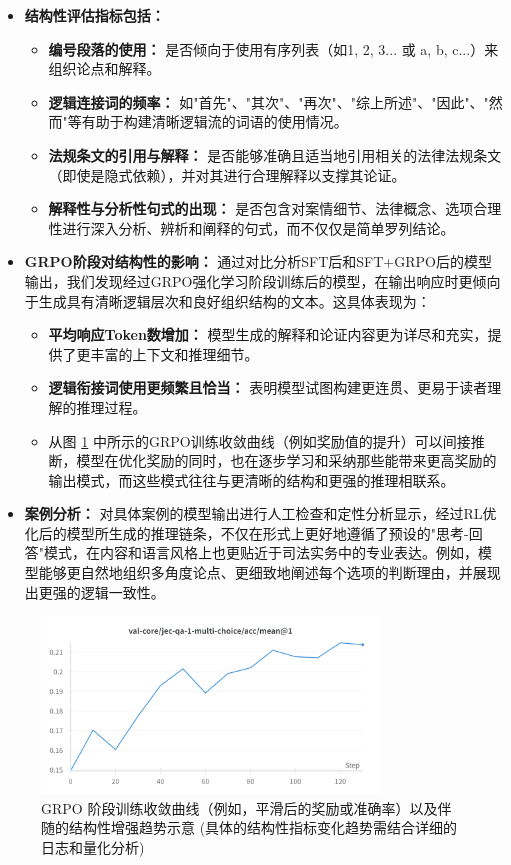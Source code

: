\documentclass{article}
\begin{document}
\begin{itemize}
    \item \textbf{结构性评估指标包括：}
    \begin{itemize}
        \item \textbf{编号段落的使用：} 是否倾向于使用有序列表（如1, 2, 3... 或 a, b, c...）来组织论点和解释。
        \item \textbf{逻辑连接词的频率：} 如"首先"、"其次"、"再次"、"综上所述"、"因此"、"然而"等有助于构建清晰逻辑流的词语的使用情况。
        \item \textbf{法规条文的引用与解释：} 是否能够准确且适当地引用相关的法律法规条文（即使是隐式依赖），并对其进行合理解释以支撑其论证。
        \item \textbf{解释性与分析性句式的出现：} 是否包含对案情细节、法律概念、选项合理性进行深入分析、辨析和阐释的句式，而不仅仅是简单罗列结论。
    \end{itemize}
    \item \textbf{GRPO阶段对结构性的影响：} 通过对比分析SFT后和SFT+GRPO后的模型输出，我们发现经过GRPO强化学习阶段训练后的模型，在输出响应时更倾向于生成具有清晰逻辑层次和良好组织结构的文本。这具体表现为：
    \begin{itemize}
        \item \textbf{平均响应Token数增加：} 模型生成的解释和论证内容更为详尽和充实，提供了更丰富的上下文和推理细节。
        \item \textbf{逻辑衔接词使用更频繁且恰当：} 表明模型试图构建更连贯、更易于读者理解的推理过程。
        \item 从图 \ref{fig:grpo_distill_convergence} 中所示的GRPO训练收敛曲线（例如奖励值的提升）可以间接推断，模型在优化奖励的同时，也在逐步学习和采纳那些能带来更高奖励的输出模式，而这些模式往往与更清晰的结构和更强的推理相联系。
    \end{itemize}
    \item \textbf{案例分析：} 对具体案例的模型输出进行人工检查和定性分析显示，经过RL优化后的模型所生成的推理链条，不仅在形式上更好地遵循了预设的"思考-回答"模式，在内容和语言风格上也更贴近于司法实务中的专业表达。例如，模型能够更自然地组织多角度论点、更细致地阐述每个选项的判断理由，并展现出更强的逻辑一致性。
\end{itemize}

\begin{figure}[h]
\centering
\includegraphics[width=0.8\textwidth]{figures/GRPO_DeepSeek-R1-Distill-Qwen-7B.png} %
\caption{GRPO 阶段训练收敛曲线（例如，平滑后的奖励或准确率）以及伴随的结构性增强趋势示意 (具体的结构性指标变化趋势需结合详细的日志和量化分析)}
\label{fig:grpo_distill_convergence}
\end{figure}
\end{document}
